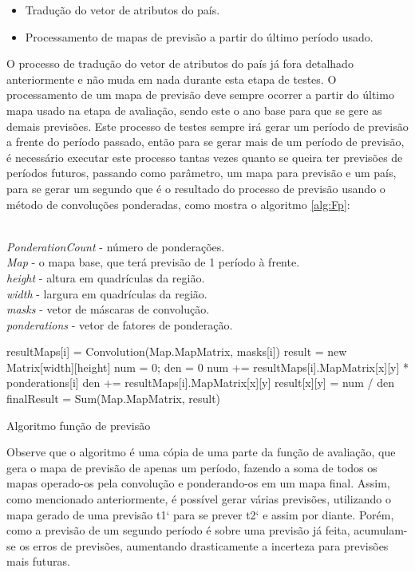 \begin{itemize}
\item Tradução do vetor de atributos do país.
\item Processamento de mapas de previsão a partir do último período usado.
\end{itemize}

O processo de tradução do vetor de atributos do país já fora detalhado anteriormente e não muda em nada durante esta etapa de testes. O processamento de um mapa de previsão deve sempre ocorrer a partir do último mapa usado na etapa de avaliação, sendo este o ano base para que se gere as demais previsões. Este processo de testes sempre irá gerar um período de previsão a frente do período passado, então para se gerar mais de um período de previsão, é necessário executar este processo tantas vezes quanto se queira ter previsões de períodos futuros, passando como parâmetro, um mapa para previsão e um país, para se gerar um segundo que é o resultado do processo de previsão usando o método de convoluções ponderadas, como mostra o algoritmo \ref{alg:Fp}:

\begin{algorithm}[h]
\SetAlgoLined
\KwData
{
\\ \emph{PonderationCount} - número de ponderações.
\\ \emph{Map} - o mapa base, que terá previsão de 1 período à frente.
\\ \emph{height} - altura em quadrículas da região.
\\ \emph{width} - largura em quadrículas da região.
\\ \emph{masks} - vetor de máscaras de convolução.
\\ \emph{ponderations} - vetor de fatores de ponderação. 
}
 
  {
   	resultMaps[i] = Convolution(Map.MapMatrix, masks[i])\;
    }
     result = new Matrix[width][height]\;
     {
         {
           num = 0; den = 0\;
           {
 			num += resultMaps[i].MapMatrix[x][y] * ponderations[i]\;
             den += resultMaps[i].MapMatrix[x][y]\;
           }
           result[x][y] = num / den\;
         }
     }
     finalResult = Sum(Map.MapMatrix, result)\;
   
 \caption{Algoritmo função de previsão}
\label{alg:Fp}
\end{algorithm}

Observe que o algoritmo é uma cópia de uma parte da função de avaliação, que gera o mapa de previsão de apenas um período, fazendo a soma de todos os mapas operado-os pela convolução e ponderando-os em um mapa final. Assim, como mencionado anteriormente, é possível gerar várias previsões, utilizando o mapa gerado de uma previsão t1` para se prever t2` e assim por diante. Porém, como a previsão de um segundo período é sobre uma previsão já feita, acumulam-se os erros de previsões, aumentando drasticamente a incerteza para previsões mais futuras.


